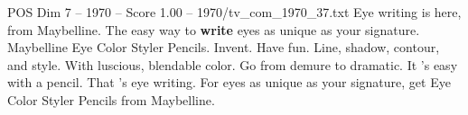 \begin{textsample}{POS Dim 7 – 1970 – Score 1.00 – 1970/tv\_com\_1970\_37.txt}  \label{ex:f7_pos_040}
Eye writing is here, from Maybelline.
The easy way to \textbf{write} eyes as unique as your signature.
Maybelline Eye Color Styler Pencils.
Invent.
Have fun.
Line, shadow, contour, and style.
With luscious, blendable color.
Go from demure to dramatic.
It 's easy with a pencil.
That 's eye writing.
For eyes as unique as your signature, get Eye Color Styler Pencils from Maybelline.

\end{textsample}
